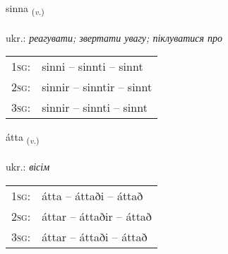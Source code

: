 \documentclass[frontgrid, backgrid]{flacards}\usepackage[]{graphicx}\usepackage[]{xcolor}
\begin{document}
\renewcommand{\flhead}{\vskip5pt \fboxsep=0pt {\small\bfseries\footnotesize Sagnorð | дієслово}}
\renewcommand{\fcfoot}{\vskip5pt \fboxsep=0pt \hspace{2pt}{\small\bfseries\footnotesize 1K}}

\renewcommand{\blhead}{\vskip5pt {\small\bfseries\footnotesize Sagnorð | дієслово }}
\renewcommand{\bcfoot}{\vskip5pt \hspace{2pt}{\small\bfseries\footnotesize 1K}}


{sinna \small{\textsubscript{(\textit{v.})}} \\[1ex] %
\textphonetic{[sɪna]} \\
ukr.: \emph{реагувати; звертати увагу; піклуватися про} \\  [2ex]
\renewcommand*{\arraystretch}{0.8}
\begin{tabular}{p{1cm}l}
\textsc{1sg}: & sinni -- sinnti -- sinnt \\ 
\textsc{2sg}: & sinnir -- sinntir -- sinnt \\ 
\textsc{3sg}: & sinnir -- sinnti -- sinnt \\ 
\end{tabular}
}

\renewcommand{\flhead}{\vskip5pt \fboxsep=0pt {\small\bfseries\footnotesize Sagnorð | дієслово}}
\renewcommand{\fcfoot}{\vskip5pt \fboxsep=0pt \hspace{2pt}{\small\bfseries\footnotesize 1K}}

\renewcommand{\blhead}{\vskip5pt {\small\bfseries\footnotesize Sagnorð | дієслово }}
\renewcommand{\bcfoot}{\vskip5pt \hspace{2pt}{\small\bfseries\footnotesize 1K}}


{átta \small{\textsubscript{(\textit{v.})}} \\[1ex] %
\textphonetic{[auhta]} \\
ukr.: \emph{вісім} \\  [2ex]
\renewcommand*{\arraystretch}{0.8}
\begin{tabular}{p{1cm}l}
\textsc{1sg}: & átta -- áttaði -- áttað \\ 
\textsc{2sg}: & áttar -- áttaðir -- áttað \\ 
\textsc{3sg}: & áttar -- áttaði -- áttað \\ 
\end{tabular}
}
\end{document}
